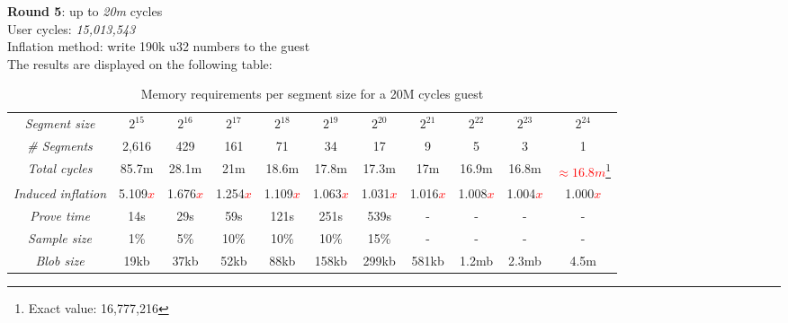 \documentclass[a4paper, 10pt]{article}
\begin{document}
\par \noindent
\textbf{Round 5}: up to \textit{20m} cycles\\
User cycles: \textit{15,013,543}\\
Inflation method: write 190k u32 numbers to the guest\\
The results are displayed on the following table:
\begin{table}[H]
  	\begin{center}
    \label{tab:table6}
    \begin{minipage}{\textwidth}
    \begin{adjustbox}{width=\textwidth}
    \begin{tabular}{c|c|c|c|c|c|c|c|c|c|c}
	  \textit{Segment size} & $2^{15}$ & $2^{16}$ & $2^{17}$ & $2^{18}$ & $2^{19}$ & $2^{20}$ & $2^{21}$ & $2^{22}$ & $2^{23}$ & $2^{24}$\\
	  \textit{\# Segments} & 2,616 & 429 & 161 & 71 & 34 & 17 & 9 & 5 & 3 & 1\\
	  \textit{Total cycles} & 85.7m & 28.1m & 21m & 18.6m & 17.8m & 17.3m & 17m & 16.9m & 16.8m & \textcolor{red}{$\approx 16.8m$}\footnote{Exact value: 16,777,216}\\
	  \textit{Induced inflation} & 5.109\textcolor{red}{$x$} & 1.676\textcolor{red}{$x$} & 1.254\textcolor{red}{$x$} & 1.109\textcolor{red}{$x$} & 1.063\textcolor{red}{$x$} & 1.031\textcolor{red}{$x$}  & 1.016\textcolor{red}{$x$} & 1.008\textcolor{red}{$x$} & 1.004\textcolor{red}{$x$} & 1.000\textcolor{red}{$x$}\\
	  \textit{Prove time} & 14s & 29s & 59s & 121s & 251s & 539s & - & - & - & -\\
	  \textit{Sample size} & 1\% & 5\% & 10\% & 10\% & 10\% & 15\% & - & - & - & -\\
	  \textit{Blob size} & 19kb & 37kb & 52kb & 88kb & 158kb & 299kb & 581kb & 1.2mb & 2.3mb & 4.5m\\
   	\end{tabular}
   	\end{adjustbox}
   	\end{minipage}
    \caption{Memory requirements per segment size for a 20M cycles guest}
  \end{center}
\end{table}
\end{document}

